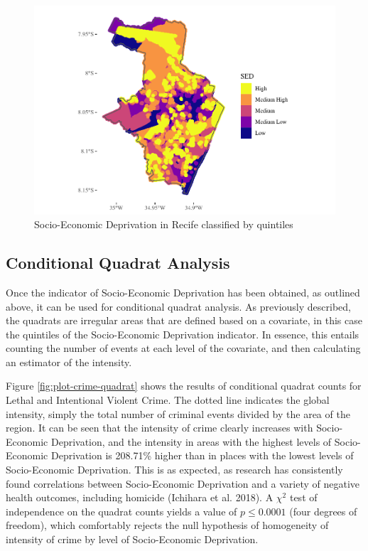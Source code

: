 \documentclass[smallextended]{svjour3}       %
\begin{document}
\begin{figure}
\centering
\includegraphics{Moral_Communities_and_Crime_v1_files/figure-latex/plot-sed-as-quintiles-1.pdf}
\caption{\label{fig:plot-sed-as-quintiles}Socio-Economic Deprivation in
Recife classified by quintiles}
\end{figure}

\hypertarget{conditional-quadrat-analysis}{%
\subsection{Conditional Quadrat
Analysis}\label{conditional-quadrat-analysis}}

Once the indicator of Socio-Economic Deprivation has been obtained, as
outlined above, it can be used for conditional quadrat analysis. As
previously described, the quadrats are irregular areas that are defined
based on a covariate, in this case the quintiles of the Socio-Economic
Deprivation indicator. In essence, this entails counting the number of
events at each level of the covariate, and then calculating an estimator
of the intensity.

Figure \ref{fig:plot-crime-quadrat} shows the results of conditional
quadrat counts for Lethal and Intentional Violent Crime. The dotted line
indicates the global intensity, simply the total number of criminal
events divided by the area of the region. It can be seen that the
intensity of crime clearly increases with Socio-Economic Deprivation,
and the intensity in areas with the highest levels of Socio-Economic
Deprivation is 208.71\% higher than in places with the lowest levels of
Socio-Economic Deprivation. This is as expected, as research has
consistently found correlations between Socio-Economic Deprivation and a
variety of negative health outcomes, including homicide (Ichihara et al.
2018). A \(\chi^2\) test of independence on the quadrat counts yields a
value of \(p\leq 0.0001\) (four degrees of freedom), which comfortably
rejects the null hypothesis of homogeneity of intensity of crime by
level of Socio-Economic Deprivation.
\end{document}
